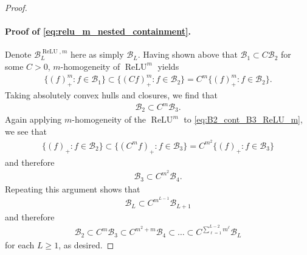 \documentclass{article}
\DeclareMathOperator{\ReLU}{\mathrm{ReLU}}
\def\cB{{\mathcal{B}}}
\begin{document}
\begin{appendices}
\begin{proof}
    \paragraph{Proof of \eqref{eq:relu_m_nested_containment}.} Denote $\cB_L^{\ReLU,m}$ here as simply $\cB_L$. Having shown above that $\cB_1 \subset C \cB_2$ for some $C > 0$, $m$-homogeneity of $\ReLU^m$ yields
    \begin{align}
        \{ (f)_+^m: f \in \cB_1 \} \subset \{ (Cf)_+^m: f \in \cB_2 \} =  C^m \{ (f)_+^m: f \in \cB_2 \}.
    \end{align}
    Taking absolutely convex hulls and closures, we find that
    \begin{align} \label{eq:B2_cont_B3_ReLU_m}
        \cB_2 \subset C^m \cB_3.
    \end{align}
    Again applying $m$-homogeneity of the $\ReLU^m$ to \eqref{eq:B2_cont_B3_ReLU_m}, we see that
    \begin{align}
        \{ (f)_+: f \in \cB_2 \} \subset \{ (C^m f)_+: f \in \cB_3 \} = C^{m^2} \{ (f)_+: f \in \cB_3 \}
    \end{align}
    and therefore
    \begin{align}
        \cB_3 \subset C^{m^2} \cB_4.
    \end{align}
    Repeating this argument shows that
    \begin{align}
        \cB_L \subset C^{m^{L-1}} \cB_{L+1}
    \end{align}
    and therefore
    \begin{align}
        \cB_2 \subset C^m \cB_3 \subset C^{m^2+m} \cB_4 \subset \dots \subset C^{\sum_{\ell=1}^{L-2} m^\ell} \cB_L
    \end{align}
    for each $L \geq 1$, as desired.
\end{proof}



\end{appendices}
\end{document}

